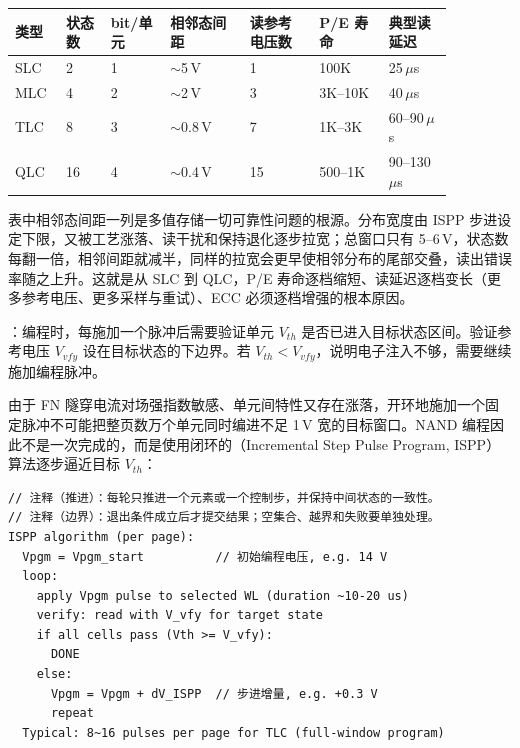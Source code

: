 \begin{longtable}{L{0.09\linewidth}L{0.09\linewidth}L{0.12\linewidth}L{0.16\linewidth}L{0.14\linewidth}L{0.14\linewidth}L{0.13\linewidth}}
\toprule
类型 & 状态数 & bit/单元 & 相邻态间距 & 读参考电压数 & P/E 寿命 & 典型读延迟 \\
\midrule
SLC & 2 & 1 & $\sim$5\,V & 1 & 100K & 25\,$\mu$s \\\tablerowrule
MLC & 4 & 2 & $\sim$2\,V & 3 & 3K--10K & 40\,$\mu$s \\\tablerowrule
TLC & 8 & 3 & $\sim$0.8\,V & 7 & 1K--3K & 60--90\,$\mu$s \\\tablerowrule
QLC & 16 & 4 & $\sim$0.4\,V & 15 & 500--1K & 90--130\,$\mu$s \\
\bottomrule
\end{longtable}

表中相邻态间距一列是多值存储一切可靠性问题的根源。分布宽度由 ISPP 步进设定下限，又被工艺涨落、读干扰和保持退化逐步拉宽；总窗口只有 5--6\,V，状态数每翻一倍，相邻间距就减半，同样的拉宽会更早使相邻分布的尾部交叠，读出错误率随之上升。这就是从 SLC 到 QLC，P/E 寿命逐档缩短、读延迟逐档变长（更多参考电压、更多采样与重试）、ECC 必须逐档增强的根本原因。

：编程时，每施加一个脉冲后需要验证单元 $V_{th}$ 是否已进入目标状态区间。验证参考电压 $V_{vfy}$ 设在目标状态的下边界。若 $V_{th} < V_{vfy}$，说明电子注入不够，需要继续施加编程脉冲。


由于 FN 隧穿电流对场强指数敏感、单元间特性又存在涨落，开环地施加一个固定脉冲不可能把整页数万个单元同时编进不足 1\,V 宽的目标窗口。NAND 编程因此不是一次完成的，而是使用闭环的（Incremental Step Pulse Program, ISPP）算法逐步逼近目标 $V_{th}$：

\begin{lstlisting}
// 注释（推进）：每轮只推进一个元素或一个控制步，并保持中间状态的一致性。
// 注释（边界）：退出条件成立后才提交结果；空集合、越界和失败要单独处理。
ISPP algorithm (per page):
  Vpgm = Vpgm_start          // 初始编程电压, e.g. 14 V
  loop:
    apply Vpgm pulse to selected WL (duration ~10-20 us)
    verify: read with V_vfy for target state
    if all cells pass (Vth >= V_vfy):
      DONE
    else:
      Vpgm = Vpgm + dV_ISPP  // 步进增量, e.g. +0.3 V
      repeat
  Typical: 8~16 pulses per page for TLC (full-window program)
\end{lstlisting}


